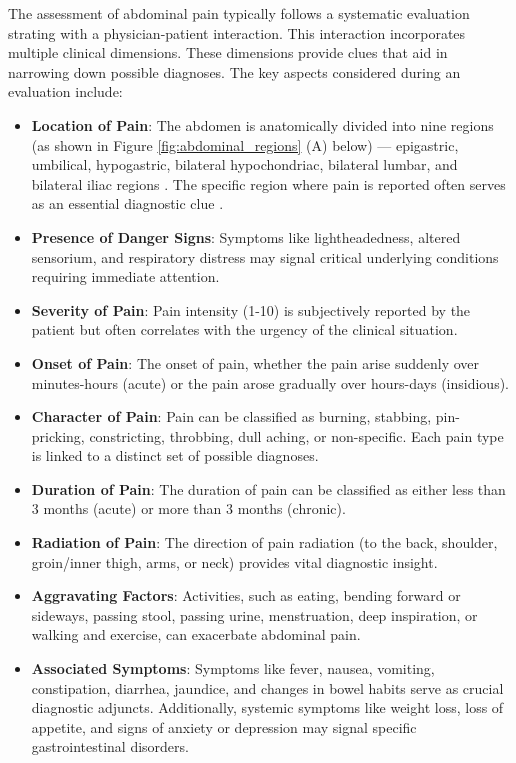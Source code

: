 \noindent The assessment of abdominal pain typically follows a systematic evaluation strating with a physician-patient interaction. This interaction incorporates multiple clinical dimensions. These dimensions provide clues that aid in narrowing down possible diagnoses. The key aspects considered during an evaluation include:
\begin{itemize}
    \item \textcolor{TUMRed}{\textbf{Location of Pain}}: The abdomen is anatomically divided into nine regions (as shown in Figure \ref{fig:abdominal_regions} (A) below) --- epigastric, umbilical, hypogastric, bilateral hypochondriac, bilateral lumbar, and bilateral iliac regions \cite{AbExm}. The specific region where pain is reported often serves as an essential diagnostic clue \cite{gans2015guideline}.
    \item \textcolor{TUMRed}{\textbf{Presence of Danger Signs}}: Symptoms like lightheadedness, altered sensorium, and respiratory distress may signal critical underlying conditions requiring immediate attention.
    \item \textcolor{TUMRed}{\textbf{Severity of Pain}}: Pain intensity (1-10) is subjectively reported by the patient but often correlates with the urgency of the clinical situation.
    \item \textcolor{TUMRed}{\textbf{Onset of Pain}}: The onset of pain, whether the pain arise suddenly over minutes-hours (acute) or the pain arose gradually over hours-days (insidious).
    \item \textcolor{TUMRed}{\textbf{Character of Pain}}: Pain can be classified as burning, stabbing, pin-pricking, constricting, throbbing, dull aching, or non-specific. Each pain type is linked to a distinct set of possible diagnoses.
    \item \textcolor{TUMRed}{\textbf{Duration of Pain}}: The duration of pain can be classified as either less than 3 months (acute) or more than 3 months (chronic).
    \item \textcolor{TUMRed}{\textbf{Radiation of Pain}}: The direction of pain radiation (to the back, shoulder, groin/inner thigh, arms, or neck) provides vital diagnostic insight.
    \item \textcolor{TUMRed}{\textbf{Aggravating Factors}}: Activities, such as eating, bending forward or sideways, passing stool, passing urine, menstruation, deep inspiration, or walking and exercise, can exacerbate abdominal pain.
    \item \textcolor{TUMRed}{\textbf{Associated Symptoms}}: Symptoms like fever, nausea, vomiting, constipation, diarrhea, jaundice, and changes in bowel habits serve as crucial diagnostic adjuncts. Additionally, systemic symptoms like weight loss, loss of appetite, and signs of anxiety or depression may signal specific gastrointestinal disorders.

\end{itemize}
